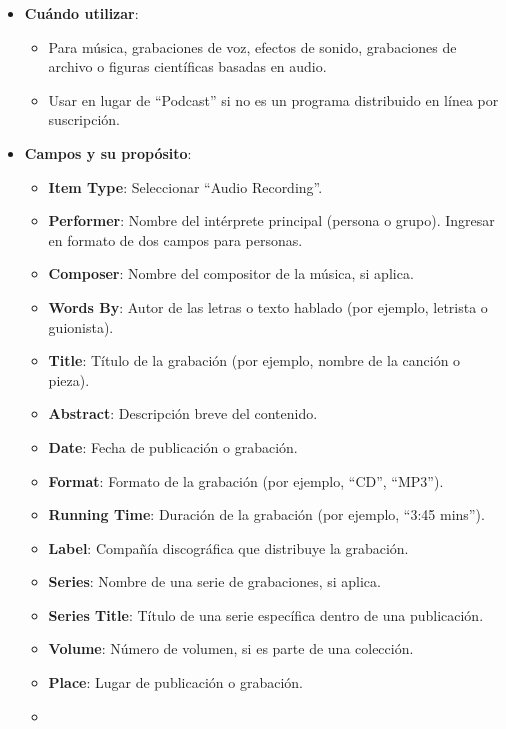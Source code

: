 \documentclass[
  jou,
  floatsintext,
  longtable,
  a4paper,
  nolmodern,
  notxfonts,
  notimes,
  12pt,
  colorlinks=true,linkcolor=blue,citecolor=blue,urlcolor=blue]{apa7}
\providecommand{\tightlist}{%
  \setlength{\itemsep}{0pt}\setlength{\parskip}{0pt}}
\begin{document}
\begin{itemize}
\tightlist
\item
  \textbf{Cuándo utilizar}:

  \begin{itemize}
  \tightlist
  \item
    Para música, grabaciones de voz, efectos de sonido, grabaciones de
    archivo o figuras científicas basadas en audio.
  \item
    Usar en lugar de ``Podcast'' si no es un programa distribuido en
    línea por suscripción.
  \end{itemize}
\item
  \textbf{Campos y su propósito}:

  \begin{itemize}
  \tightlist
  \item
    \textbf{Item Type}: Seleccionar ``Audio Recording''.
  \item
    \textbf{Performer}: Nombre del intérprete principal (persona o
    grupo). Ingresar en formato de dos campos para personas.
  \item
    \textbf{Composer}: Nombre del compositor de la música, si aplica.
  \item
    \textbf{Words By}: Autor de las letras o texto hablado (por ejemplo,
    letrista o guionista).
  \item
    \textbf{Title}: Título de la grabación (por ejemplo, nombre de la
    canción o pieza).
  \item
    \textbf{Abstract}: Descripción breve del contenido.
  \item
    \textbf{Date}: Fecha de publicación o grabación.
  \item
    \textbf{Format}: Formato de la grabación (por ejemplo, ``CD'',
    ``MP3'').
  \item
    \textbf{Running Time}: Duración de la grabación (por ejemplo, ``3:45
    mins'').
  \item
    \textbf{Label}: Compañía discográfica que distribuye la grabación.
  \item
    \textbf{Series}: Nombre de una serie de grabaciones, si aplica.
  \item
    \textbf{Series Title}: Título de una serie específica dentro de una
    publicación.
  \item
    \textbf{Volume}: Número de volumen, si es parte de una colección.
  \item
    \textbf{Place}: Lugar de publicación o grabación.
  \item

\end{itemize}
\end{itemize}
\end{document}
